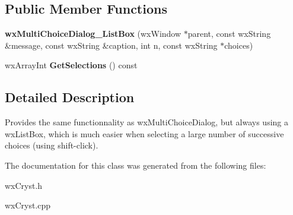 \subsection*{Public Member Functions}
\begin{DoxyCompactItemize}
\item 
\mbox{\label{class_obj_cryst_1_1wx_multi_choice_dialog___list_box_a3048c7db35d3c35a993ca818f8ec3087}} 
{\bfseries wx\+Multi\+Choice\+Dialog\+\_\+\+List\+Box} (wx\+Window $\ast$parent, const wx\+String \&message, const wx\+String \&caption, int n, const wx\+String $\ast$choices)
\item 
\mbox{\label{class_obj_cryst_1_1wx_multi_choice_dialog___list_box_a46ec544f580aed8e4fb2e635c1592dd2}} 
wx\+Array\+Int {\bfseries Get\+Selections} () const
\end{DoxyCompactItemize}


\subsection{Detailed Description}
Provides the same functionnality as wx\+Multi\+Choice\+Dialog, but always using a wx\+List\+Box, which is much easier when selecting a large number of successive choices (using shift-\/click). 

The documentation for this class was generated from the following files\+:\begin{DoxyCompactItemize}
\item 
wx\+Cryst.\+h\item 
wx\+Cryst.\+cpp\end{DoxyCompactItemize}
